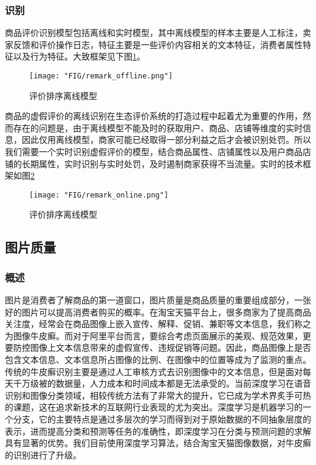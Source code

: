 \subsubsection{识别}

商品评价识别模型包括离线和实时模型，其中离线模型的样本主要是人工标注，卖家反馈和评价操作日志，特征主要是一些评价内容相关的文本特征，消费者属性特征以及行为特征。大致框架见下图\ref{fig:chap12_remark_offline}。
\begin{figure}
	\centering
	\texttt{[image: "FIG/remark\_offline.png"]}
	\caption{评价排序离线模型}
	\label{fig:chap12_remark_offline}
\end{figure}

商品的虚假评价的离线识别在生态评价系统的打造过程中起着尤为重要的作用，然而存在的问题是，由于离线模型不能及时的获取用户、商品、店铺等维度的实时信息，因此仅用离线模型，商家可能已经取得一部分利益之后才会被识别处罚。所以我们需要一个实时识别虚假评价的模型，结合商品属性、店铺属性以及用户商品店铺的长期属性，实时识别与实时处罚，及时遏制商家获得不当流量。实时的技术框架如图\ref{fig:chap12_remark_online}

\begin{figure}
	\centering
	\texttt{[image: "FIG/remark\_online.png"]}
	\caption{评价排序离线模型}
	\label{fig:chap12_remark_online}
\end{figure}

\subsection{图片质量}

\subsubsection{概述}

图片是消费者了解商品的第一道窗口，图片质量是商品质量的重要组成部分，一张好的图片可以提高消费者购买的概率。在淘宝天猫平台上，很多商家为了提高商品关注度，经常会在商品图像上嵌入宣传、解释、促销、兼职等文本信息，我们称之为图像牛皮癣。而对于阿里平台而言，要综合考虑页面展示的美观、规范效果，更要防控图像上文本信息带来的虚假宣传、违规促销等问题。因此，商品图像上是否包含文本信息、文本信息所占图像的比例、在图像中的位置等成为了监测的重点。传统的牛皮癣识别主要是通过人工审核方式去识别图像中的文本信息，但是面对每天千万级被的数据量，人力成本和时间成本都是无法承受的。当前深度学习在语音识别和图像分类领域，相较传统方法有了非常大的提升，它已成为学术界炙手可热的课题，这在追求新技术的互联网行业表现的尤为突出。深度学习是机器学习的一个分支，它的主要特点是通过多层次的学习而得到对于原始数据的不同抽象层度的表示，进而提高分类和预测等任务的准确性，即深度学习在分类与预测问题的求解具有显著的优势。我们目前使用深度学习算法，结合淘宝天猫图像数据，对牛皮癣的识别进行了升级。

